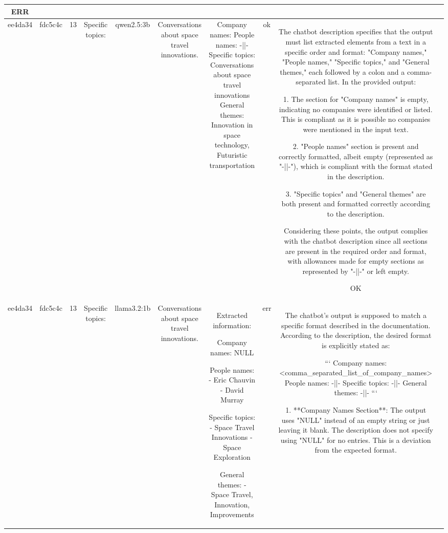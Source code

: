 \begin{table}[h!]
\begin{tabular}{|c|c|c|c|c|c|c|c|c|c|}
ERR & \\
\hline
ee4da34 & fdc5c4c & 13 & Specific topics: & qwen2.5:3b & Conversations about space travel innovations. & Company names: 
People names: -||-
Specific topics: Conversations about space travel innovations
General themes: Innovation in space technology, Futuristic transportation & ok & The chatbot description specifies that the output must list extracted elements from a text in a specific order and format: "Company names," "People names," "Specific topics," and "General themes," each followed by a colon and a comma-separated list. In the provided output:

1. The section for "Company names" is empty, indicating no companies were identified or listed. This is compliant as it is possible no companies were mentioned in the input text.
   
2. "People names" section is present and correctly formatted, albeit empty (represented as "-||-"), which is compliant with the format stated in the description.

3. "Specific topics" and "General themes" are both present and formatted correctly according to the description.

Considering these points, the output complies with the chatbot description since all sections are present in the required order and format, with allowances made for empty sections as represented by "-||-" or left empty.

OK & \\
\hline
ee4da34 & fdc5c4c & 13 & Specific topics: & llama3.2:1b & Conversations about space travel innovations. & Extracted information:

Company names:
NULL

People names:
- Eric Chauvin
- David Murray

Specific topics:
- Space Travel Innovations
- Space Exploration

General themes:
- Space Travel, Innovation, Improvements & err & The chatbot's output is supposed to match a specific format described in the documentation. According to the description, the desired format is explicitly stated as:

```
Company names: <comma_separated_list_of_company_names>
People names: -||-
Specific topics: -||-
General themes: -||-
```

1. **Company Names Section**: The output uses "NULL" instead of an empty string or just leaving it blank. The description does not specify using "NULL" for no entries. This is a deviation from the expected format.
   

\end{tabular}
\end{table}
